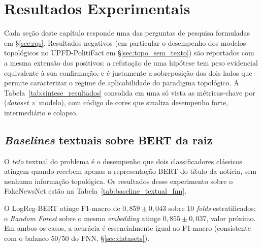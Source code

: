 
\chapter{Resultados Experimentais}
\label{cap:resultados}

Cada se\c{c}\~ao deste cap\'itulo responde uma das perguntas de pesquisa
formuladas em \S\ref{sec:rqs}. Resultados negativos (em particular o
desempenho dos modelos topol\'ogicos no UPFD-PolitiFact em
\S\ref{sec:topo_sem_texto}) s\~ao reportados com a mesma extens\~ao
dos positivos: a refuta\c{c}\~ao de uma hip\'otese tem peso evidencial
equivalente \`a sua confirma\c{c}\~ao, e \'e justamente a sobreposi\c{c}\~ao
dos dois lados que permite caracterizar o regime de aplicabilidade do
paradigma topol\'ogico. A Tabela~\ref{tab:sintese_resultados} consolida
em uma s\'o vista as m\'etricas-chave por (\emph{dataset} $\times$
modelo), com c\'odigo de cores que sinaliza desempenho forte,
intermedi\'ario e colapso.



\section{\emph{Baselines} textuais sobre BERT da raiz}
\label{sec:baseline_textual}

O \emph{teto} textual do problema \'e o desempenho que dois
classificadores cl\'assicos atingem quando recebem apenas a
representa\c{c}\~ao BERT do t\'itulo da not\'icia, sem nenhuma
informa\c{c}\~ao topol\'ogica. Os
resultados desse experimento sobre o FakeNewsNet est\~ao na
Tabela~\ref{tab:baseline_textual_fnn}.



O LogReg-BERT atinge F1-macro de $0{,}859 \pm 0{,}043$ sobre 10
\emph{folds} estratificados; o \emph{Random Forest} sobre o mesmo
\emph{embedding} atinge $0{,}855 \pm 0{,}037$, valor pr\'oximo. Em
ambos os casos, a acur\'acia \'e essencialmente igual ao F1-macro
(consistente com o balanco $50/50$ do FNN, \S\ref{sec:datasets}).

